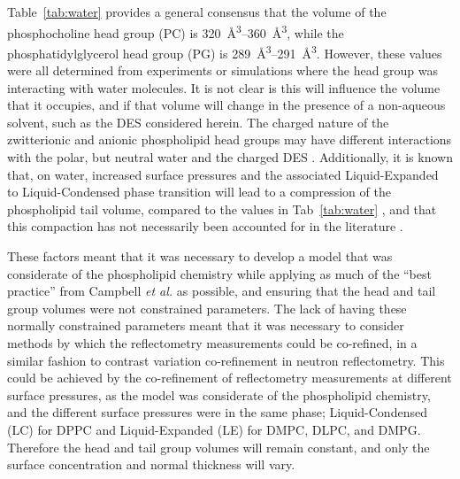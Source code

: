 Table~\ref{tab:water} provides a general consensus that the volume of the phosphocholine head group (PC) is \SIrange{320}{360}{\angstrom\cubed}, while the phosphatidylglycerol head group (PG) is \SIrange{289}{291}{\angstrom\cubed}.
However, these values were all determined from experiments or simulations where the head group was interacting with water molecules.
It is not clear is this will influence the volume that it occupies, and if that volume will change in the presence of a non-aqueous solvent, such as the DES considered herein.
The charged nature of the zwitterionic and anionic phospholipid head groups may have different interactions with the polar, but neutral water and the charged DES \cite{sanchez-fernandez_self-assembly_2018}.
Additionally, it is known that, on water, increased surface pressures and the associated Liquid-Expanded to Liquid-Condensed phase transition will lead to a compression of the phospholipid tail volume, compared to the values in Tab~\ref{tab:water} \cite{marsh_molecular_2010,small_lateral_1984}, and that this compaction has not necessarily been accounted for in the literature \cite{campbell_structure_2018}.

These factors meant that it was necessary to develop a model that was considerate of the phospholipid chemistry while applying as much of the ``best practice'' from Campbell \emph{et al.} \cite{campbell_structure_2018} as possible, and ensuring that the head and tail group volumes were not constrained parameters.
The lack of having these normally constrained parameters meant that it was necessary to consider methods by which the reflectometry measurements could be co-refined, in a similar fashion to contrast variation co-refinement in neutron reflectometry.
This could be achieved by the co-refinement of reflectometry measurements at different surface pressures, as the model was considerate of the phospholipid chemistry, and the different surface pressures were in the same phase; Liquid-Condensed (LC) for DPPC and Liquid-Expanded (LE) for DMPC, DLPC, and DMPG.
Therefore the head and tail group volumes will remain constant, and only the surface concentration and normal thickness will vary.

